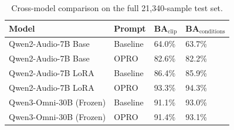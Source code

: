 \begin{table}[h]
\centering
\caption{Cross-model comparison on the full 21,340-sample test set.}
\label{tab:prelim_multimodel_comparison}
\footnotesize
\setlength{\tabcolsep}{5pt}
\renewcommand{\arraystretch}{1.12}
\begin{tabular}{llll}
\toprule
\textbf{Model} & \textbf{Prompt} & \textbf{BA$_{\text{clip}}$} & \textbf{BA$_{\text{conditions}}$} \\
\midrule
Qwen2-Audio-7B Base & Baseline & 64.0\% & 63.7\% \\
Qwen2-Audio-7B Base & OPRO & 82.6\% & 82.2\% \\
Qwen2-Audio-7B LoRA & Baseline & 86.4\% & 85.9\% \\
Qwen2-Audio-7B LoRA & OPRO & 93.3\% & 94.3\% \\
Qwen3-Omni-30B (Frozen) & Baseline & 91.1\% & 93.0\% \\
Qwen3-Omni-30B (Frozen) & OPRO & 91.4\% & 93.1\% \\
\bottomrule
\end{tabular}
\end{table}